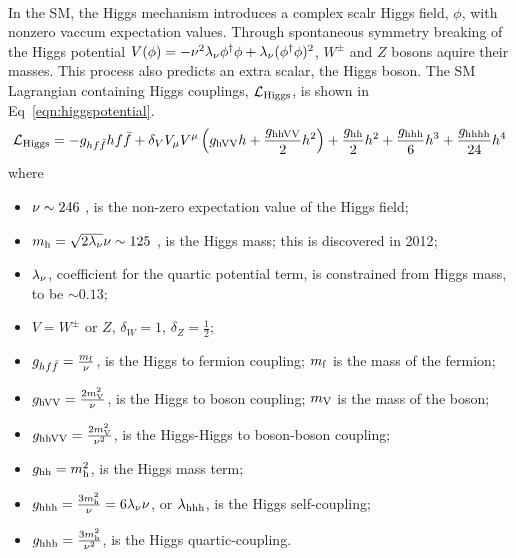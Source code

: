 \paragraph{}
In the SM, the Higgs mechanism introduces a complex scalr Higgs field, $\phi$, with nonzero vaccum expectation values. Through spontaneous symmetry breaking of the Higgs potential $V(\phi) = -\nu^2\lambda_{\rm \nu} \phi^{\dagger}\phi + \lambda_{\rm \nu}(\phi^\dagger\phi)^2$, $W^{\pm}$ and $Z$ bosons aquire their masses. This process also predicts an extra scalar, the Higgs boson. The SM Lagrangian containing Higgs couplings, $\mathcal{L}_{\rm Higgs}$, is shown in Eq~\ref{eqn:higgspotential}.
\begin{equation}
\label{eqn:higgspotential}
\mathcal{L}_{\rm Higgs} = -g_{hf\bar{f}} hf\bar{f} + \delta_{V} V_{\rm\mu} V^{\rm\mu}\left(g_{\rm hVV} h + \frac{g_{\rm hhVV}}{2}h^2\right) + \frac{g_{\rm hh}}{2}h^2 + \frac{g_{\rm hhh}}{6}h^3 + \frac{g_{\rm hhhh}}{24}h^4 
\end{equation}
where 
\begin{itemize}
	\item $\rm\nu \sim 246$ \GeV, is the non-zero expectation value of the Higgs field;\
	\item $m_{\rm h} = \sqrt{2\lambda_{\rm \nu}}\nu \sim 125$ \GeV, is the Higgs mass; this is discovered in 2012\cite{ATLASHiggsDisc, CMSHiggsDisc}; 
	\item $\lambda_{\rm \nu}$, coefficient for the quartic potential term, is constrained from Higgs mass, to be $\sim 0.13$;
	\item $V = W^{\pm}$ or $Z$, $\delta_{W} = 1$, $\delta_{Z} = \frac{1}{2}$;
	\item $g_{hf\bar{f}} = \frac{m_{\rm f}}{\rm\nu}$, is the Higgs to fermion coupling; $m_{\rm f}$ is the mass of the fermion;
	\item $g_{\rm hVV} = \frac{2m_{\rm V}^2}{\rm\nu}$, is the Higgs to boson coupling; $m_{\rm V}$ is the mass of the boson;
	\item $g_{\rm hhVV} = \frac{2m_{\rm V}^2}{\rm\nu^2}$, is the Higgs-Higgs to boson-boson coupling;
	\item $g_{\rm hh} = m_{\rm h}^2$, is the Higgs mass term;
	\item $g_{\rm hhh} = \frac{3m_{\rm h}^2}{\rm\nu} = 6 \lambda_{\rm \nu} \nu$, or $\lambda_{\rm hhh}$, is the Higgs self-coupling;
	\item $g_{\rm hhh} = \frac{3m_{\rm h}^2}{\rm\rm\nu^2}$, is the Higgs quartic-coupling.
\end{itemize}
